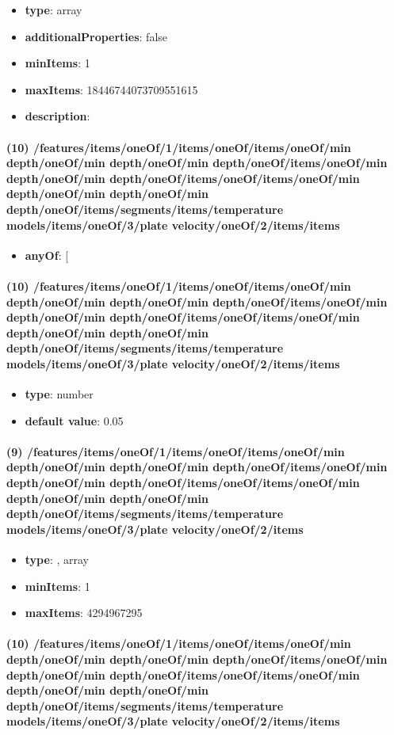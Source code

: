 \begin{itemize}[leftmargin=9em]\item {\bf type}: array
\item {\bf additionalProperties}: false
\item {\bf minItems}: 1
\item {\bf maxItems}: 18446744073709551615
\item {\bf description}: 
\end{itemize}\paragraph{(10) /features/items/oneOf/1/items/oneOf/items/oneOf/min depth/oneOf/min depth/oneOf/min depth/oneOf/items/oneOf/min depth/oneOf/min depth/oneOf/items/oneOf/items/oneOf/min depth/oneOf/min depth/oneOf/min depth/oneOf/items/segments/items/temperature models/items/oneOf/3/plate velocity/oneOf/2/items/items}
\begin{itemize}[leftmargin=10em]\item {\bf anyOf}: [\end{itemize}\paragraph{(10) /features/items/oneOf/1/items/oneOf/items/oneOf/min depth/oneOf/min depth/oneOf/min depth/oneOf/items/oneOf/min depth/oneOf/min depth/oneOf/items/oneOf/items/oneOf/min depth/oneOf/min depth/oneOf/min depth/oneOf/items/segments/items/temperature models/items/oneOf/3/plate velocity/oneOf/2/items/items}
\begin{itemize}[leftmargin=10em]\item {\bf type}: number\item {\bf default value}: 0.05
\end{itemize}\paragraph{(9) /features/items/oneOf/1/items/oneOf/items/oneOf/min depth/oneOf/min depth/oneOf/min depth/oneOf/items/oneOf/min depth/oneOf/min depth/oneOf/items/oneOf/items/oneOf/min depth/oneOf/min depth/oneOf/min depth/oneOf/items/segments/items/temperature models/items/oneOf/3/plate velocity/oneOf/2/items}
\begin{itemize}[leftmargin=9em]\item {\bf type}: , array\item {\bf minItems}: 1
\item {\bf maxItems}: 4294967295
\end{itemize}\paragraph{(10) /features/items/oneOf/1/items/oneOf/items/oneOf/min depth/oneOf/min depth/oneOf/min depth/oneOf/items/oneOf/min depth/oneOf/min depth/oneOf/items/oneOf/items/oneOf/min depth/oneOf/min depth/oneOf/min depth/oneOf/items/segments/items/temperature models/items/oneOf/3/plate velocity/oneOf/2/items/items}
